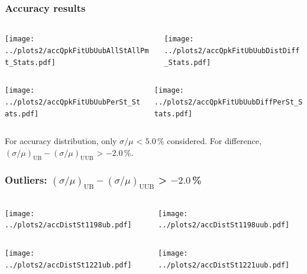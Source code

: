 \documentclass[aspectratio=169]{beamer}
\begin{document}
\begin{frame}
  \frametitle{Accuracy results}
  \vspace{0.5cm}
  \begin{columns}
    \begin{column}{0.5\textwidth}
      \texttt{[image: ../plots2/accQpkFitUbUubAllStAllPmt\_Stats.pdf]}
    \end{column}
    \begin{column}{0.5\textwidth}
      \texttt{[image: ../plots2/accQpkFitUbUubDistDiff\_Stats.pdf]}
    \end{column}
  \end{columns}
  \begin{columns}
    \begin{column}{0.5\textwidth}
      \texttt{[image: ../plots2/accQpkFitUbUubPerSt\_Stats.pdf]}
    \end{column}
    \begin{column}{0.5\textwidth}
      \texttt{[image: ../plots2/accQpkFitUbUubDiffPerSt\_Stats.pdf]}
    \end{column}
  \end{columns}
  {\scriptsize
  For accuracy distribution, only $\sigma/\mu$ < $5.0$\,\% considered.
  For difference, $(\sigma/\mu)_{\mathrm{UB}} - (\sigma/\mu)_{\mathrm{UUB}}$
  > $-2.0$\,\%.
  }
\end{frame}

\begin{frame}
  \frametitle{Outliers: $(\sigma/\mu)_{\mathrm{UB}} -
  (\sigma/\mu)_{\mathrm{UUB}}$ > $-2.0$\,\% }
  \vspace{0.5cm}
  \begin{columns}
    \begin{column}{0.5\textwidth}
      \texttt{[image: ../plots2/accDistSt1198ub.pdf]}
    \end{column}
    \begin{column}{0.5\textwidth}
      \texttt{[image: ../plots2/accDistSt1198uub.pdf]}
    \end{column}
  \end{columns}
  \begin{columns}
    \begin{column}{0.5\textwidth}
      \texttt{[image: ../plots2/accDistSt1221ub.pdf]}
    \end{column}
    \begin{column}{0.5\textwidth}
      \texttt{[image: ../plots2/accDistSt1221uub.pdf]}
    \end{column}
  \end{columns}
\end{frame}
\end{document}
